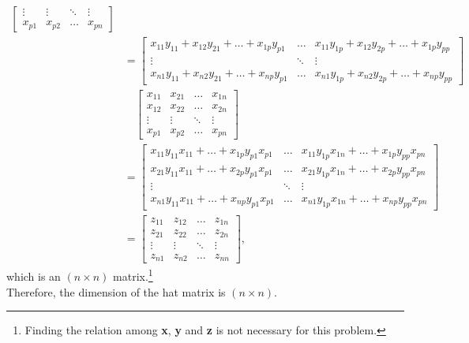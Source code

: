\documentclass[10pt]{article}
\begin{document}
\begin{enumerate}[1)]
\begin{align*}
\begin{bmatrix}
    \vdots & \vdots & \ddots & \vdots\\
    x_{p1} & x_{p2} & \dots & x_{pn}
  \end{bmatrix}
\\
&=
  \begin{bmatrix}
    x_{11}y_{11}+x_{12}y_{21}+\dots+x_{1p}y_{p1} & \dots & x_{11}y_{1p}+x_{12}y_{2p}+\dots+x_{1p}y_{pp}\\
    \vdots & \ddots & \vdots\\
    x_{n1}y_{11}+x_{n2}y_{21}+\dots+x_{np}y_{p1} & \dots & x_{n1}y_{1p}+x_{n2}y_{2p}+\dots+x_{np}y_{pp}
  \end{bmatrix}
\\
&\quad
  \begin{bmatrix}
    x_{11} & x_{21} & \dots & x_{1n}\\
    x_{12} & x_{22} & \dots & x_{2n}\\
    \vdots & \vdots & \ddots & \vdots\\
    x_{p1} & x_{p2} & \dots & x_{pn}
  \end{bmatrix}
\\
&=
  \begin{bmatrix}
    x_{11}y_{11}x_{11}+\dots+x_{1p}y_{p1}x_{p1} & \dots & x_{11}y_{1p}x_{1n}+\dots+x_{1p}y_{pp}x_{pn}\\
    x_{21}y_{11}x_{11}+\dots+x_{2p}y_{p1}x_{p1} & \dots & x_{21}y_{1p}x_{1n}+\dots+x_{2p}y_{pp}x_{pn}\\
    \vdots & \ddots & \vdots\\
    x_{n1}y_{11}x_{11}+\dots+x_{np}y_{p1}x_{p1} & \dots & x_{n1}y_{1p}x_{1n}+\dots+x_{np}y_{pp}x_{pn}
  \end{bmatrix}
\\
&=
  \begin{bmatrix}
    z_{11} & z_{12} & \dots & z_{1n}\\
    z_{21} & z_{22} & \dots & z_{2n}\\
    \vdots & \vdots & \ddots & \vdots\\
    z_{n1} & z_{n2} & \dots & z_{nn}
  \end{bmatrix}
,
\end{align*}
which is an $(n\times n)$ matrix.\footnote{\;Finding the relation among \textbf{x}, \textbf{y} and \textbf{z} is not necessary for this problem.}\\
Therefore, the dimension of the hat matrix is $(n\times n)$.
\vspace{3mm}


\end{enumerate}
\end{document}
